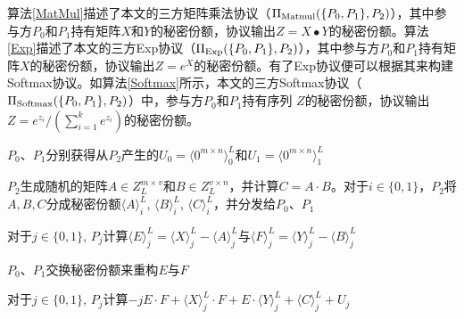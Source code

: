 算法\ref{MatMul}描述了本文的三方矩阵乘法协议（$\Pi_{\rm Matmul}(\{P_0, P_1\}, P_2)$），其中参与方$P_0$和$P_1$持有矩阵$X$和$Y$的秘密份额，协议输出$Z=X∙Y$的秘密份额。算法\ref{Exp}描述了本文的三方Exp协议（$\Pi_{\rm Exp}(\{P_0, P_1\}, P_2)$），其中参与方$P_0$和$P_1$持有矩阵$X$的秘密份额，协议输出$Z=e^X$的秘密份额。有了Exp协议便可以根据其来构建Softmax协议。如算法\ref{Softmax}所示，本文的三方Softmax协议（$\Pi_{\rm Softmax}(\{P_0, P_1\}, P_2)$）中，参与方$P_0$和$P_1$持有序列 $Z$的秘密份额，协议输出$Z=e^{z_i}/(\sum_{i=1}^k e^{z_i})$的秘密份额。

%	
%	
%	
%	
%	
%	
%	

\begin{algorithm}[H]
	\SetAlgoLined
	
	$P_0$、$P_1$分别获得从$P_2$产生的$U_0=\langle 0^{m\times n}\rangle_0^L$和$U_1=\langle 0^{m\times n}\rangle_1^L$
	
	$P_2$生成随机的矩阵$A\in Z_L^{m\times v}$和$B\in Z_L^{v\times n}$，并计算$C=A\cdot B$。对于$i\in \{0, 1\}$，$P_2$将$A, B, C$分成秘密份额$\langle A\rangle_i^L$, $\langle B\rangle_i^L$, $\langle C\rangle_i^L$，并分发给$P_0$、$P_1$
	
	对于$j\in \{0, 1\}$, $P_j$计算$\langle E\rangle_j^L = \langle X\rangle_j^L - \langle A\rangle_j^L$与$\langle F\rangle_j^L = \langle Y\rangle_j^L - \langle B\rangle_j^L$ 
	
	$P_0$、$P_1$交换秘密份额来重构$E$与$F$
	
	对于$j\in \{0, 1\}$, $P_j$计算$-jE\cdot F + \langle X\rangle_j^L\cdot F + E\cdot \langle Y\rangle_j^L + \langle C\rangle_j^L + U_j$
	
	\caption{ $\Pi_{\rm Matmul}(\{P_0, P_1\}, P_2)$ }
	\label{MatMul}
\end{algorithm}

